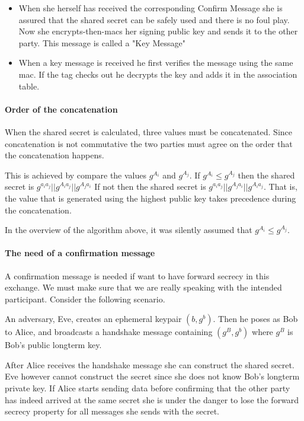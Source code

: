 \documentclass[12pt,titlepage,a4paper]{article}
\begin{document}
{\begin{itemize}
	\item[] When she herself has received the corresponding Confirm Message she is assured that
		the shared secret can be safely used and there is no foul play. Now she
		encrypts-then-macs her signing public key and sends it to the other party. This
		message is called a "Key Message"


	\item[] When a key message is received he first verifies the message using the same mac.
		If the tag checks out he decrypts the key and adds it in the association table.
\end{itemize}

\paragraph{Order of the concatenation}
When the shared secret is calculated, three values must be concatenated. Since
concatenation is not commutative the two parties must agree on the order that the
concatenation happens.

This is achieved by compare the values $g^{A_i}$ and $g^{A_j}$. If
$g^{A_i} \le g^{A_j}$ then the shared secret is $g^{a_ia_j} || g^{A_ia_j} || g^{A_ja_i}$
If not then the shared secret is $g^{a_ia_j} || g^{A_ja_i} || g^{A_ia_j}$. That is, the
value that is generated using the highest public key takes precedence during the
concatenation.

In the overview of the algorithm above, it was silently assumed that
$g^{A_i} \le g^{A_j}$.

\paragraph{The need of a confirmation message}
\label{confirm_message_explain}
A confirmation message is needed if want to have forward secrecy in this exchange.
We must make sure that we are really speaking with the intended participant. Consider
the following scenario.

An adversary, Eve, creates an ephemeral keypair $(b, g^b)$. Then he poses as Bob to Alice,
and broadcasts a handshake message containing $(g^B,g^b)$ where $g^B$ is Bob's
public longterm key.

After Alice receives the handshake message she can construct the shared secret. Eve
however cannot construct the secret since she does not know Bob's longterm
private key. If Alice starts sending data before confirming that the other party
has indeed arrived at the same secret she is under the danger to lose the forward
secrecy property for all messages she sends with the secret.

}
\end{document}
